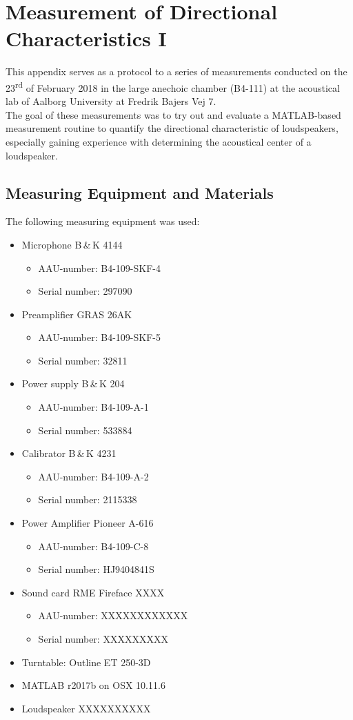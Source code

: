 \chapter{Measurement of Directional Characteristics I}
This appendix serves as a protocol to a series of measurements conducted on the 23\textsuperscript{rd} of February 2018 in the large anechoic chamber (B4-111) at the acoustical lab of Aalborg University at Fredrik Bajers Vej 7.\\
The goal of these measurements was to try out and evaluate a MATLAB-based measurement routine to quantify the directional characteristic of loudspeakers, especially gaining experience with determining the acoustical center of a loudspeaker.

\section*{Measuring Equipment and Materials}
The following measuring equipment was used:
\begin{itemize}[noitemsep]
\item Microphone B\,\&\,K 4144
\begin{itemize}[noitemsep]
\item AAU-number: B4-109-SKF-4
\item Serial number: 297090
\end{itemize}
\item Preamplifier GRAS 26AK
\begin{itemize}[noitemsep]
\item AAU-number: B4-109-SKF-5
\item Serial number: 32811
\end{itemize}
\item Power supply B\,\&\,K 204
\begin{itemize}
\item AAU-number: B4-109-A-1
\item Serial number: 533884
\end{itemize}
\item Calibrator B\,\&\,K 4231
\begin{itemize}[noitemsep]
\item AAU-number: B4-109-A-2
\item Serial number: 2115338
\end{itemize}
\item Power Amplifier Pioneer A-616
\begin{itemize}[noitemsep]
\item AAU-number: B4-109-C-8
\item Serial number: HJ9404841S
\end{itemize}
\item Sound card RME Fireface XXXX
\begin{itemize}[noitemsep]
\item AAU-number: XXXXXXXXXXXX
\item Serial number: XXXXXXXXX
\end{itemize}
\item Turntable: Outline ET 250-3D
\item MATLAB r2017b on OSX 10.11.6
\item Loudspeaker XXXXXXXXXX
\end{itemize}

